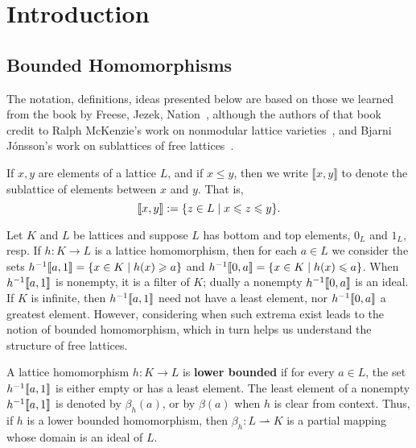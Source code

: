 \author[N.~Ru\v{s}kuc]{Nik Ru\v{s}kuc}


\date{\today}



\maketitle

\section{Introduction}

\subsection{Bounded Homomorphisms}
\label{sec:introduction}
The notation, definitions, ideas presented below are based on those 
we learned from the book by Freese, Jezek, Nation~\cite{MR1319815}, 
although the authors of that book credit to Ralph McKenzie's work on nonmodular 
lattice varieties~\cite{MR0313141}, and Bjarni J\'onsson's work on 
sublattices of free lattices~\cite{MR0472614}.

If $x, y$ are elements of a lattice $L$, and if $x \leq y$, then we write
$\llbracket x, y \rrbracket$ to denote the sublattice of elements between $x$ and $y$.
That is, 
\[
\llbracket x, y \rrbracket := \{z \in L \mid x \leqslant z \leqslant y \}.
\]

Let $K$ and $L$ be lattices and suppose $L$ has bottom and top elements, $0_L$ and $1_L$, resp.  
If $h \colon K \to L$ is a lattice homomorphism, then for each
$a \in L$ we consider the sets $h^{-1}\llbracket a, 1 \rrbracket = \{x \in K \mid h(x) \geqslant a\}$ and
$h^{-1}\llbracket 0, a \rrbracket = \{x \in K \mid h(x) \leqslant a \}$. 
When $h^{-1}\llbracket a, 1 \rrbracket$ is nonempty,
it is a filter of $K$; dually a nonempty $h^{-1}\llbracket 0, a \rrbracket$ is an ideal. 
If $K$ is infinite, then 
$h^{-1}\llbracket a, 1 \rrbracket$ need not have a least element, nor 
$h^{-1}\llbracket 0, a \rrbracket$ a greatest element. However, 
considering when such extrema exist leads to the notion of
bounded homomorphism, which in turn helps us understand the structure of free lattices.


A lattice homomorphism $h \colon K \to L$ is \textbf{lower bounded} if for every 
$a \in L$, the set $h^{-1} \llbracket a, 1 \rrbracket$ is either empty or has a least element. 
The least element of a nonempty $h^{-1}\llbracket a, 1\rrbracket$ is denoted by $\beta_h(a)$, or  
by $\beta(a)$ when $h$ is clear from context.
Thus, if $h$ is a lower bounded homomorphism, then $\beta_h \colon L \rightharpoonup K$ 
is a partial mapping whose domain is an ideal of $L$. 

